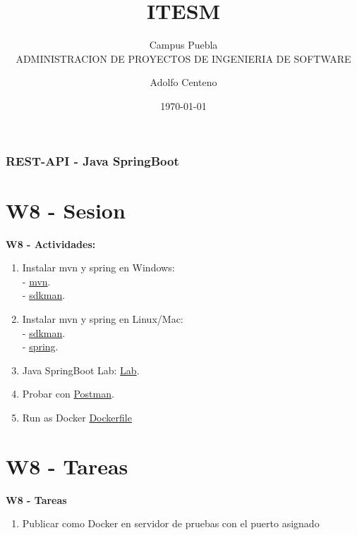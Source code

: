\documentclass{beamer}
\begin{document}
\title{ITESM}  
\subtitle{Campus Puebla\\ADMINISTRACION DE PROYECTOS DE INGENIERIA DE SOFTWARE
}
\author{Adolfo Centeno}
\date{\today} 


\begin{frame}
\titlepage
\end{frame}

\begin{frame}\frametitle{REST-API - Java SpringBoot}
\tableofcontents
\end{frame} 


\section{W8 - Sesion }

\begin{frame}

\textbf{W8 - Actividades:}

\begin{enumerate}
\item
    Instalar mvn y spring en Windows:  \\
    - \href{https://mkyong.com/maven/how-to-install-maven-in-windows/}{mvn}. \\
    - \href{https://medium.com/ejemplos-de-programacion/instalar-sdkman-en-windows-524ed9ede7b}{sdkman}. \\

\item
    Instalar mvn y spring en Linux/Mac:  \\
    - \href{https://sdkman.io/}{sdkman}. \\
    - \href{https://docs.spring.io/spring-boot/docs/2.0.0.M5/reference/html/getting-started-installing-spring-boot.html}{spring}. \\

\item
	Java SpringBoot Lab: \href{https://www.callicoder.com/spring-boot-jpa-hibernate-postgresql-restful-crud-api-example/}{Lab}.	
\item
    Probar con \href{https://www.postman.com/downloads/}{Postman}.	
\item
	Run as Docker \href{https://github.com/adsoftsito/ng5-api/blob/master/Dockerfile}{Dockerfile}
	 

	

\end{enumerate} 

\end{frame}


\section{W8  - Tareas }

\begin{frame}


\textbf{W8  - Tareas}


\begin{enumerate}
\item
	Publicar como Docker en servidor de pruebas con el puerto asignado
	
\end{enumerate} 


\end{frame}
\end{document}
